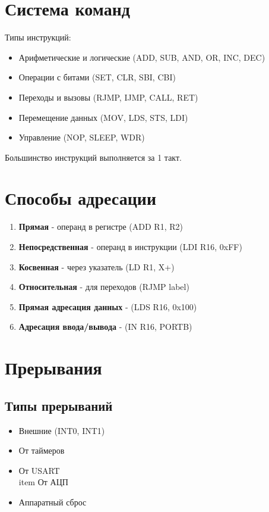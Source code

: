 \documentclass[a4paper,12pt]{article}
\begin{document}
\section{Система команд}
Типы инструкций:
\begin{itemize}
    \item Арифметические и логические (ADD, SUB, AND, OR, INC, DEC)
    \item Операции с битами (SET, CLR, SBI, CBI)
    \item Переходы и вызовы (RJMP, IJMP, CALL, RET)
    \item Перемещение данных (MOV, LDS, STS, LDI)
    \item Управление (NOP, SLEEP, WDR)
\end{itemize}

Большинство инструкций выполняется за 1 такт.

\section{Способы адресации}
\begin{enumerate}
    \item \textbf{Прямая} - операнд в регистре (ADD R1, R2)
    \item \textbf{Непосредственная} - операнд в инструкции (LDI R16, 0xFF)
    \item \textbf{Косвенная} - через указатель (LD R1, X+)
    \item \textbf{Относительная} - для переходов (RJMP label)
    \item \textbf{Прямая адресация данных} - (LDS R16, 0x100)
    \item \textbf{Адресация ввода/вывода} - (IN R16, PORTB)
\end{enumerate}

\section{Прерывания}
\subsection{Типы прерываний}
\begin{itemize}
    \item Внешние (INT0, INT1)
    \item От таймеров
    \item От USART
    \\item От АЦП
    \item Аппаратный сброс
\end{itemize}
\end{document}
